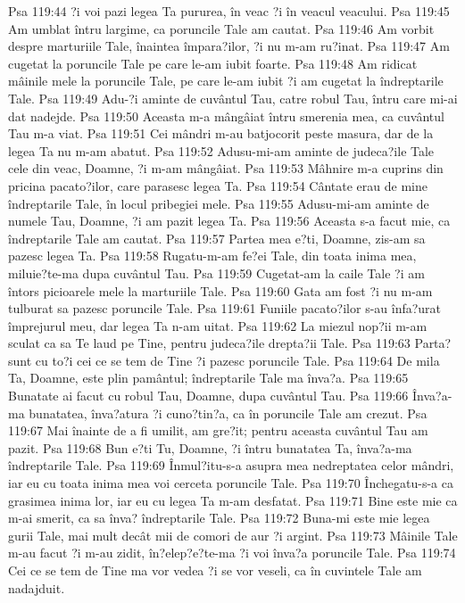Psa 119:44  ?i voi pazi legea Ta pururea, în veac ?i în veacul veacului.
Psa 119:45  Am umblat întru largime, ca poruncile Tale am cautat.
Psa 119:46  Am vorbit despre marturiile Tale, înaintea împara?ilor, ?i nu m-am ru?inat.
Psa 119:47  Am cugetat la poruncile Tale pe care le-am iubit foarte.
Psa 119:48  Am ridicat mâinile mele la poruncile Tale, pe care le-am iubit ?i am cugetat la îndreptarile Tale.
Psa 119:49  Adu-?i aminte de cuvântul Tau, catre robul Tau, întru care mi-ai dat nadejde.
Psa 119:50  Aceasta m-a mângâiat întru smerenia mea, ca cuvântul Tau m-a viat.
Psa 119:51  Cei mândri m-au batjocorit peste masura, dar de la legea Ta nu m-am abatut.
Psa 119:52  Adusu-mi-am aminte de judeca?ile Tale cele din veac, Doamne, ?i m-am mângâiat.
Psa 119:53  Mâhnire m-a cuprins din pricina pacato?ilor, care parasesc legea Ta.
Psa 119:54  Cântate erau de mine îndreptarile Tale, în locul pribegiei mele.
Psa 119:55  Adusu-mi-am aminte de numele Tau, Doamne, ?i am pazit legea Ta.
Psa 119:56  Aceasta s-a facut mie, ca îndreptarile Tale am cautat.
Psa 119:57  Partea mea e?ti, Doamne, zis-am sa pazesc legea Ta.
Psa 119:58  Rugatu-m-am fe?ei Tale, din toata inima mea, miluie?te-ma dupa cuvântul Tau.
Psa 119:59  Cugetat-am la caile Tale ?i am întors picioarele mele la marturiile Tale.
Psa 119:60  Gata am fost ?i nu m-am tulburat sa pazesc poruncile Tale.
Psa 119:61  Funiile pacato?ilor s-au înfa?urat împrejurul meu, dar legea Ta n-am uitat.
Psa 119:62  La miezul nop?ii m-am sculat ca sa Te laud pe Tine, pentru judeca?ile drepta?ii Tale.
Psa 119:63  Parta? sunt cu to?i cei ce se tem de Tine ?i pazesc poruncile Tale.
Psa 119:64  De mila Ta, Doamne, este plin pamântul; îndreptarile Tale ma înva?a.
Psa 119:65  Bunatate ai facut cu robul Tau, Doamne, dupa cuvântul Tau.
Psa 119:66  Înva?a-ma bunatatea, înva?atura ?i cuno?tin?a, ca în poruncile Tale am crezut.
Psa 119:67  Mai înainte de a fi umilit, am gre?it; pentru aceasta cuvântul Tau am pazit.
Psa 119:68  Bun e?ti Tu, Doamne, ?i întru bunatatea Ta, înva?a-ma îndreptarile Tale.
Psa 119:69  Înmul?itu-s-a asupra mea nedreptatea celor mândri, iar eu cu toata inima mea voi cerceta poruncile Tale.
Psa 119:70  Închegatu-s-a ca grasimea inima lor, iar eu cu legea Ta m-am desfatat.
Psa 119:71  Bine este mie ca m-ai smerit, ca sa înva? îndreptarile Tale.
Psa 119:72  Buna-mi este mie legea gurii Tale, mai mult decât mii de comori de aur ?i argint.
Psa 119:73  Mâinile Tale m-au facut ?i m-au zidit, în?elep?e?te-ma ?i voi înva?a poruncile Tale.
Psa 119:74  Cei ce se tem de Tine ma vor vedea ?i se vor veseli, ca în cuvintele Tale am nadajduit.
